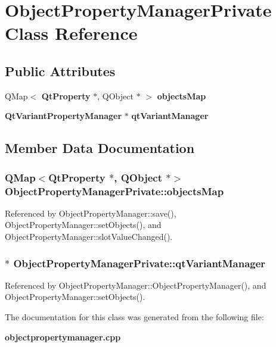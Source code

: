 \section{Object\+Property\+Manager\+Private Class Reference}
\label{classObjectPropertyManagerPrivate}
\subsection*{Public Attributes}
\begin{DoxyCompactItemize}
\item 
Q\+Map$<$ {\bf Qt\+Property} $\ast$, Q\+Object $\ast$ $>$ {\bf objects\+Map}
\item 
{\bf Qt\+Variant\+Property\+Manager} $\ast$ {\bf qt\+Variant\+Manager}
\end{DoxyCompactItemize}


\subsection{Member Data Documentation}
\subsubsection[{objects\+Map}]{\setlength{\rightskip}{0pt plus 5cm}Q\+Map$<${\bf Qt\+Property} $\ast$, Q\+Object $\ast$$>$ Object\+Property\+Manager\+Private\+::objects\+Map}\label{classObjectPropertyManagerPrivate_a12de09d3c874a9d3bd9b8d778c433ad1}


Referenced by Object\+Property\+Manager\+::save(), Object\+Property\+Manager\+::set\+Objects(), and Object\+Property\+Manager\+::slot\+Value\+Changed().

\subsubsection[{qt\+Variant\+Manager}]{$\ast$ Object\+Property\+Manager\+Private\+::qt\+Variant\+Manager}\label{classObjectPropertyManagerPrivate_a0b2cad1703e37a879627dc82b4400918}


Referenced by Object\+Property\+Manager\+::\+Object\+Property\+Manager(), and Object\+Property\+Manager\+::set\+Objects().



The documentation for this class was generated from the following file\+:\begin{DoxyCompactItemize}
\item 
{\bf objectpropertymanager.\+cpp}\end{DoxyCompactItemize}
